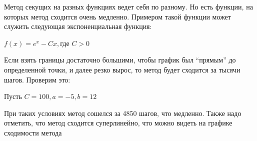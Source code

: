 \documentclass[12pt, a4paper]{article}
\begin{document}
        Метод секущих на разных функциях ведет себя по разному. Но есть функции, на которых метод сходится очень медленно. Примером такой функции может служить следующая экспоненциальная функция:

        $f(x) = e^x - Cx, \text{где } C > 0$

        Если взять границы достаточно большими, чтобы график был ``прямым'' до определенной точки, и далее резко вырос, то метод будет сходится за тысячи шагов. Проверим это:

        Пусть $C = 100, a = -5, b = 12$

        При таких условиях метод сошелся за 4850 шагов, что медленно. Также надо отметить, что метод сходится суперлинейно, что можно видеть на графике сходимости метода

        \def \picwidth {8.7cm}
\end{document}
